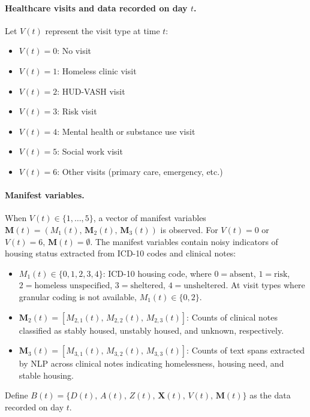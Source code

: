 \paragraph{Healthcare visits and data recorded on day $t$.}
Let $V(t)$ represent the visit type at time $t$:
\begin{itemize}
    \item $V(t) = 0$: No visit
    \item $V(t) = 1$: Homeless clinic visit
    \item $V(t) = 2$: HUD-VASH visit
    \item $V(t) = 3$: Risk visit
    \item $V(t) = 4$: Mental health or substance use visit
    \item $V(t) = 5$: Social work visit
    \item $V(t) = 6$: Other visits (primary care, emergency, etc.)
\end{itemize}

\paragraph{Manifest variables.}
When $V(t) \in \{1, \ldots, 5\}$, a vector of manifest variables $\boldsymbol{M}(t) = (M_1(t),\, \boldsymbol{M}_2(t),\, \boldsymbol{M}_3(t))$ is observed. For $V(t) = 0$ or $V(t) = 6$, $\boldsymbol{M}(t) = \emptyset$. The manifest variables contain noisy indicators of housing status extracted from ICD-10 codes and clinical notes:
\begin{itemize}
    \item $M_1(t) \in \{0, 1, 2, 3, 4\}$: ICD-10 housing code, where $0 = \text{absent}$, $1 = \text{risk}$, $2 = \text{homeless unspecified}$, $3 = \text{sheltered}$, $4 = \text{unsheltered}$. At visit types where granular coding is not available, $M_1(t) \in \{0, 2\}$.
    \item $\boldsymbol{M}_2(t) = [M_{2,1}(t),\, M_{2,2}(t),\, M_{2,3}(t)]$: Counts of clinical notes classified as stably housed, unstably housed, and unknown, respectively.
    \item $\boldsymbol{M}_3(t) = [M_{3,1}(t),\, M_{3,2}(t),\, M_{3,3}(t)]$: Counts of text spans extracted by NLP across clinical notes indicating homelessness, housing need, and stable housing.
\end{itemize}

Define $B(t) = \{D(t),\, A(t),\, Z(t),\, \boldsymbol{X}(t),\, V(t),\, \boldsymbol{M}(t)\}$ as the data recorded on day $t$.


